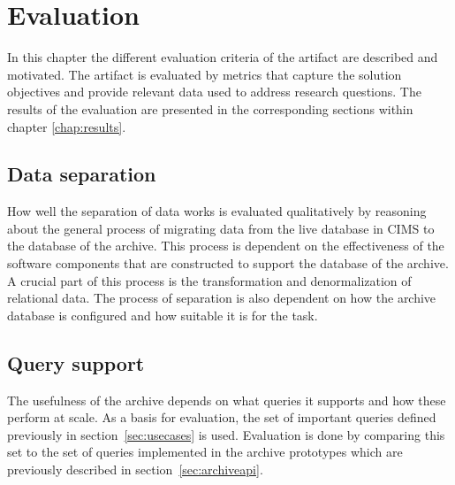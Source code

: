 \chapter{Evaluation}
\label{chap:eval}

In this chapter the different evaluation criteria of the artifact are described and motivated. The artifact is evaluated by metrics that capture the solution objectives and provide relevant data used to address research questions. The results of the evaluation are presented in the corresponding sections within chapter \ref{chap:results}.

\section{Data separation}
How well the separation of data works is evaluated qualitatively by reasoning about the general process of migrating data from the live database in CIMS to the database of the archive. This process is dependent on the effectiveness of the software components that are constructed to support the database of the archive.
A crucial part of this process is the transformation and denormalization of relational data. The process of separation is also dependent on how the archive database is configured and how suitable it is for the task. 

\section{Query support}
The usefulness of the archive depends on what queries it supports and how these perform at scale. As a basis for evaluation, the set of important queries defined previously in section~\ref{sec:usecases} is used. Evaluation is done by comparing this set to the set of queries implemented in the archive prototypes which are previously described in section~\ref{sec:archiveapi}.


%

